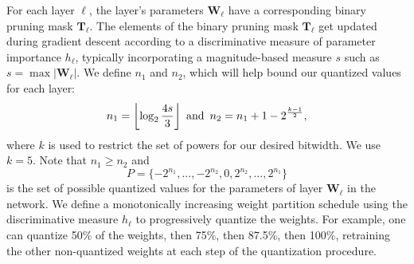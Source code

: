 \documentclass[conference]{IEEEtran}
\begin{document}
For each layer $\ell$, the layer's parameters $\mathbf{W_\ell}$ have a corresponding binary pruning mask $\mathbf{T_\ell}$.
The elements of the binary pruning mask $\mathbf{T_\ell}$ get updated during gradient descent according to a discriminative measure of parameter importance $h_\ell$, typically incorporating a magnitude-based measure $s$ such as $s = \max|\mathbf{W_\ell}|$.
We define $n_1$ and $n_2$, which will help bound our quantized values for each layer:
\begin{equation*}
    n_1 = \left\lfloor \log_2 \frac{4s}{3} \right\rfloor \textrm{ and \,} n_2 = n_1 + 1 - 2^{\frac{k-1}{2}},
\end{equation*} 
where $k$ is used to restrict the set of powers for our desired bitwidth. We use $k=5$.
Note that $n_1 \geq n_2$ and
$$P = \{-2^{n_1}, ... , -2^{n_2}, 0, 2^{n_2}, ..., 2^{n_1} \}$$
is the set of possible quantized values for the parameters of layer $\mathbf{W_\ell}$ in the network. 
We define a monotonically increasing weight partition schedule using the discriminative measure $h_\ell$ to progressively quantize the weights.
For example, one can quantize 50\% of the weights, then 75\%, then 87.5\%, then 100\%, retraining the other non-quantized weights at each step of the quantization procedure.


\end{document}
